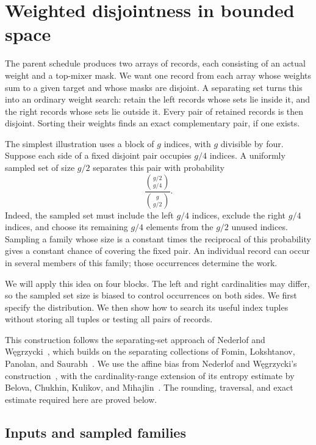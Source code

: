\section{Weighted disjointness in bounded space}\label{sec:separator}

The parent schedule produces two arrays of records, each consisting of
an actual weight and a top-mixer mask. We want one record from each
array whose weights sum to a given target and whose masks are disjoint. A separating set
turns this into an ordinary weight search: retain the left records whose
sets lie inside it, and the right records whose sets lie outside it.
Every pair of retained records is then disjoint. Sorting their weights
finds an exact complementary pair, if one exists.

The simplest illustration uses a block of $g$ indices, with $g$ divisible
by four. Suppose each side of a fixed disjoint pair occupies $g/4$
indices. A uniformly sampled set of size $g/2$ separates this pair with
probability
\[
 \frac{\binom{g/2}{g/4}}{\binom{g}{g/2}}.
\]
Indeed, the sampled set must include the left $g/4$ indices, exclude
the right $g/4$ indices, and choose its remaining $g/4$ elements from
the $g/2$ unused indices. Sampling a family whose size is a constant
times the reciprocal of this probability gives a constant chance of
covering the fixed pair. An individual record can occur in several
members of this family; those occurrences determine the work.

We will apply this idea on four blocks. The left and right cardinalities
may differ, so the sampled set size is biased to control occurrences on
both sides. We first specify the distribution. We then show how to
search its useful index tuples without storing all tuples or testing
all pairs of records.

This construction follows the separating-set approach of Nederlof and
W\k{e}grzycki~\cite[full version, Section~6]{NW21}, which builds on the
separating collections of Fomin, Lokshtanov, Panolan, and
Saurabh~\cite[Section~4.2, Definition~4.3 and Lemma~4.5]{FLPS16}.
We use the affine bias from Nederlof and W\k{e}grzycki's
construction~\cite[full version, Lemma~6.6]{NW21}, with the
cardinality-range extension of its entropy estimate by Belova, Chukhin,
Kulikov, and Mihajlin~\cite[full version, Section~4.7]{BCKM24}.
The rounding, traversal, and exact estimate required here are proved below.

\subsection{Inputs and sampled families}

